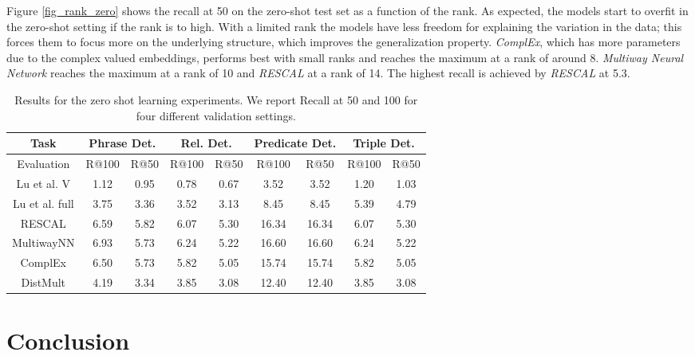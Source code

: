 \documentclass[runningheads,a4paper]{llncs}
\begin{document}
Figure \ref{fig_rank_zero} shows the recall at 50 on the zero-shot test set as a function of the rank. As expected, the models start to overfit in the zero-shot setting if the rank is to high. With a limited rank the models have less freedom for explaining the variation in the data; this forces them to focus more on the underlying structure, which improves the generalization property. \textit{ComplEx}, which has more parameters due to the complex valued embeddings, performs best with small ranks and reaches the maximum at a rank of around 8. \textit{Multiway Neural Network} reaches the maximum at a rank of 10 and \textit{RESCAL} at a rank of 14. The highest recall is achieved by \textit{RESCAL} at 5.3.


\begin{table}[t]
\centering
\caption{Results for the zero shot learning experiments. We report Recall at 50 and 100 for four different validation settings.}
\setlength{\tabcolsep}{0.4em}
{\renewcommand{\arraystretch}{1.4}
\begin{tabular}{|c||c|c||c|c||c|c||c|c|}
\hline
 Task &\multicolumn{2}{c||}{Phrase Det.} &\multicolumn{2}{c||}{Rel. Det.} &\multicolumn{2}{c||}{Predicate Det.} & \multicolumn{2}{c|}{Triple Det.} \\
\hline Evaluation & R@100 & R@50 & R@100 & R@50 & R@100 & R@50 & R@100 & R@50\\
\hline
\hline Lu et al. V \cite{visual} & 1.12 & 0.95 & 0.78 & 0.67 & 3.52 & 3.52 & 1.20 & 1.03 \\ 
\hline Lu et al. full \cite{visual} & 3.75 & 3.36 & 3.52 & 3.13 & 8.45 & 8.45 & 5.39 & 4.79 \\ 
\hline \hline RESCAL & 6.59 & 5.82 & 6.07 & 5.30 & 16.34 & 16.34 & 6.07 & 5.30\\
\hline MultiwayNN & 6.93 & 5.73 & 6.24 & 5.22 & 16.60 & 16.60 & 6.24 & 5.22 \\
\hline ComplEx & 6.50  & 5.73 & 5.82 & 5.05 & 15.74 & 15.74 & 5.82 & 5.05 \\ %
\hline DistMult & 4.19 & 3.34 & 3.85 & 3.08 & 12.40 & 12.40 & 3.85 & 3.08 \\
\hline 
\end{tabular} 
}
\label{results_zeroshot}
\end{table}

\section{Conclusion}
\label{section_conclusion}
\end{document}
